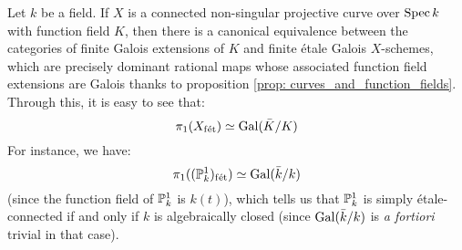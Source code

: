                 \begin{example} \label{example: etale_fundamental_group_of_a_curve}
                    Let $k$ be a field. If $X$ is a connected non-singular projective curve over $\Spec k$ with function field $K$, then there is a canonical equivalence between the categories of finite Galois extensions of $K$ and finite \'etale Galois $X$-schemes, which are precisely dominant rational maps whose associated function field extensions are Galois thanks to proposition \ref{prop: curves_and_function_fields}. Through this, it is easy to see that:
                        $$\pi_1(X_{\fet}) \cong \Gal(\bar{K}/K)$$
                    For instance, we have:
                        $$\pi_1((\P^1_k)_{\fet}) \cong \Gal(\bar{k}/k)$$
                    (since the function field of $\P^1_k$ is $k(t)$), which tells us that $\P^1_k$ is simply \'etale-connected if and only if $k$ is algebraically closed (since $\Gal(\bar{k}/k)$ is \textit{a fortiori} trivial in that case). 
                \end{example}
            
